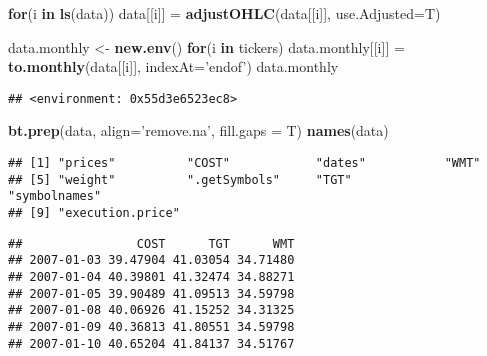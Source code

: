 \documentclass[]{article}
\newenvironment{Shaded}{\begin{snugshade}}{\end{snugshade}}
\newcommand{\ControlFlowTok}[1]{\textcolor[rgb]{0.13,0.29,0.53}{\textbf{#1}}}
\newcommand{\DataTypeTok}[1]{\textcolor[rgb]{0.13,0.29,0.53}{#1}}
\newcommand{\KeywordTok}[1]{\textcolor[rgb]{0.13,0.29,0.53}{\textbf{#1}}}
\newcommand{\NormalTok}[1]{#1}
\newcommand{\OperatorTok}[1]{\textcolor[rgb]{0.81,0.36,0.00}{\textbf{#1}}}
\newcommand{\StringTok}[1]{\textcolor[rgb]{0.31,0.60,0.02}{#1}}
\begin{document}
\begin{Shaded}
\begin{Highlighting}[]
\ControlFlowTok{for}\NormalTok{(i }\ControlFlowTok{in} \KeywordTok{ls}\NormalTok{(data)) data[[i]] =}\StringTok{ }\KeywordTok{adjustOHLC}\NormalTok{(data[[i]], }\DataTypeTok{use.Adjusted=}\NormalTok{T)}

\NormalTok{data.monthly <-}\StringTok{ }\KeywordTok{new.env}\NormalTok{()}
\ControlFlowTok{for}\NormalTok{(i }\ControlFlowTok{in}\NormalTok{ tickers) data.monthly[[i]] =}\StringTok{ }\KeywordTok{to.monthly}\NormalTok{(data[[i]], }\DataTypeTok{indexAt=}\StringTok{'endof'}\NormalTok{)}
\NormalTok{data.monthly}
\end{Highlighting}
\end{Shaded}

\begin{verbatim}
## <environment: 0x55d3e6523ec8>
\end{verbatim}

\begin{Shaded}
\begin{Highlighting}[]
\KeywordTok{bt.prep}\NormalTok{(data, }\DataTypeTok{align=}\StringTok{'remove.na'}\NormalTok{, }\DataTypeTok{fill.gaps =}\NormalTok{ T)}
\KeywordTok{names}\NormalTok{(data)}
\end{Highlighting}
\end{Shaded}

\begin{verbatim}
## [1] "prices"          "COST"            "dates"           "WMT"            
## [5] "weight"          ".getSymbols"     "TGT"             "symbolnames"    
## [9] "execution.price"
\end{verbatim}

\begin{Shaded}
\end{Shaded}

\begin{verbatim}
##                COST      TGT      WMT
## 2007-01-03 39.47904 41.03054 34.71480
## 2007-01-04 40.39801 41.32474 34.88271
## 2007-01-05 39.90489 41.09513 34.59798
## 2007-01-08 40.06926 41.15252 34.31325
## 2007-01-09 40.36813 41.80551 34.59798
## 2007-01-10 40.65204 41.84137 34.51767
\end{verbatim}

\begin{Shaded}
\end{Shaded}
\end{document}
